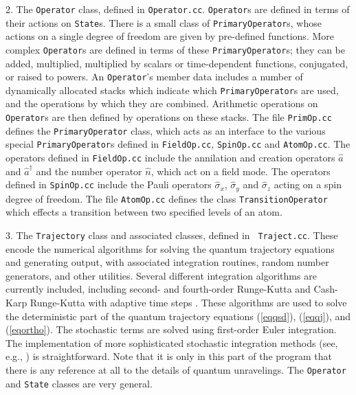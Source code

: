 2.  The {\tt Operator} class, defined in {\tt Operator.cc}.  {\tt Operator}s
are defined in terms of their actions on {\tt State}s.  There is a small class
of {\tt PrimaryOperator}s, whose actions on a single degree of freedom are
given by pre-defined functions.  More complex {\tt Operator}s are defined in
terms of these {\tt PrimaryOperator}s; they can be added, multiplied,
multiplied by scalars or time-dependent functions, conjugated, or raised to
powers.  An {\tt Operator}'s member data includes a number of dynamically
allocated stacks which indicate which {\tt PrimaryOperator}s are used, and the
operations by which they are combined.  Arithmetic operations on {\tt
Operator}s are then defined by operations on these stacks.  
The file {\tt PrimOp.cc} defines the {\tt PrimaryOperator} class, which acts as
an interface to the various special {\tt PrimaryOperator}s defined in 
{\tt FieldOp.cc}, {\tt SpinOp.cc} and {\tt AtomOp.cc}. The operators defined in
{\tt FieldOp.cc} include the annilation and creation operators $\hat a$ and
$\hat a^\dagger$ and the number operator $\hat n$, which act on a field mode. 
The operators defined in
{\tt SpinOp.cc} include the Pauli operators $\hat\sigma_x$, $\hat\sigma_y$ and
$\hat\sigma_z$ acting on a spin degree of freedom. 
The file {\tt AtomOp.cc} defines the class {\tt TransitionOperator} which
effects a transition between two specified levels of an atom. 

3.  The {\tt Trajectory} class and associated classes, defined in {\tt
Traject.cc}.  These encode the numerical algorithms for solving the quantum
trajectory equations and generating output, with associated integration
routines, random number generators, and other utilities.  Several different
integration algorithms are currently included, including second- and
fourth-order Runge-Kutta and Cash-Karp Runge-Kutta with adaptive time steps
{\cite{Press1992}}.  These algorithms are used to solve the deterministic part
of the quantum trajectory equations (\ref{eqqsd}), (\ref{eqqj}), and
(\ref{eqortho}).  The stochastic terms are solved using first-order Euler
integration.  The implementation of more sophisticated stochastic integration
methods (see, e.g., \cite{Steinbach1995a}) is straightforward. Note that it is
only in this part of the program that there is any reference at all to the
details of quantum unravelings. The {\tt Operator} and {\tt State} classes are
very general.

